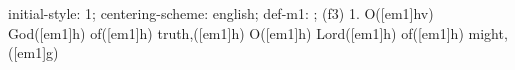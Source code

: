 initial-style: 1;
centering-scheme: english;
def-m1: \grealign;
(f3) 1. O([em1]hv) God([em1]h) of([em1]h) truth,([em1]h) O([em1]h) Lord([em1]h) of([em1]h) might,([em1]g)